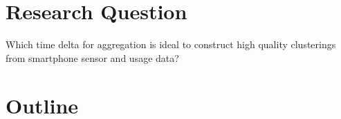 \documentclass[12pt,a4paper]{article}
\begin{document}










\section*{Research Question}
Which time delta for aggregation is ideal to construct high quality clusterings from smartphone sensor and usage data?


\section*{Outline}
\end{document}
